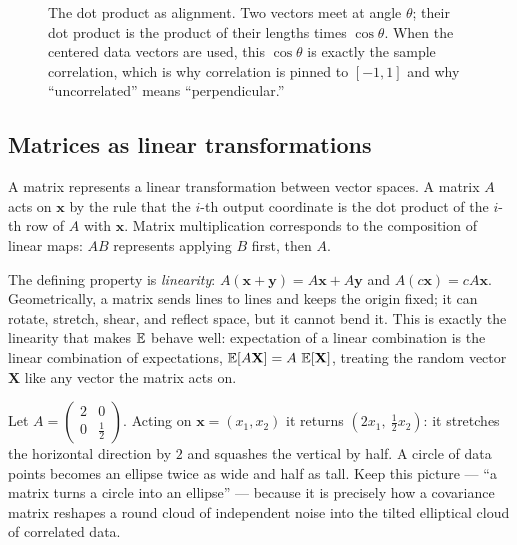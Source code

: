 \begin{figure}[H]
\centering
{}
\caption{The dot product as alignment. Two vectors meet at angle $\theta$; their dot product is the
product of their lengths times $\cos\theta$. When the centered data vectors are used, this $\cos\theta$
is exactly the sample correlation, which is why correlation is pinned to $[-1,1]$ and why
``uncorrelated'' means ``perpendicular.''}
\label{chAcla:fig-dotproduct}
\end{figure}

\subsection{Matrices as linear transformations}
\label{chAcla:matrices}

A matrix represents a linear transformation between vector spaces. A matrix $A$ acts on $\mathbf{x}$
by the rule that the $i$-th output coordinate is the dot product of the $i$-th row of $A$ with
$\mathbf{x}$. Matrix multiplication corresponds to the composition of linear maps: $AB$ represents
applying $B$ first, then $A$.

The defining property is \emph{linearity}: $A(\mathbf{x}+\mathbf{y})=A\mathbf{x}+A\mathbf{y}$ and
$A(c\mathbf{x})=cA\mathbf{x}$. Geometrically, a matrix sends lines to lines and keeps the origin
fixed; it can rotate, stretch, shear, and reflect space, but it cannot bend it. This is exactly the
linearity that makes $\operatorname{\mathbb{E}}$ behave well: expectation of a linear combination is the linear combination
of expectations, $\operatorname{\mathbb{E}}[A\mathbf{X}] = A\,\operatorname{\mathbb{E}}[\mathbf{X}]$, treating the random vector $\mathbf{X}$ like any vector the matrix acts on.

\begin{example}
\label{chAcla:ex-matrix-action}
Let $A=\begin{pmatrix} 2 & 0 \\ 0 & \tfrac12 \end{pmatrix}$. Acting on $\mathbf{x}=(x_1,x_2)$ it
returns $(2x_1,\ \tfrac12 x_2)$: it stretches the horizontal direction by $2$ and squashes the
vertical by half. A circle of data points becomes an ellipse twice as wide and half as tall. Keep
this picture --- ``a matrix turns a circle into an ellipse'' --- because it is precisely how a
covariance matrix reshapes a round cloud of independent noise into the tilted elliptical cloud of
correlated data.
\end{example}

